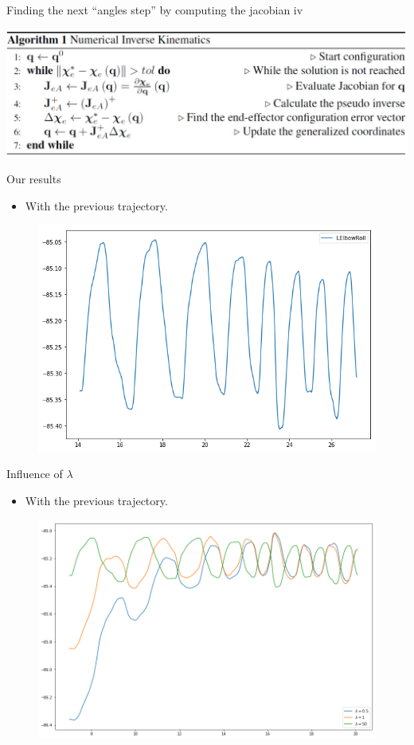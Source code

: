\documentclass{beamer}
\begin{document}
\begin{frame}{Finding the next ``angles step'' by computing the jacobian iv}

	\includegraphics[scale = 0.3]{eth3.PNG}\cite{6}
\end{frame}


\begin{frame}{Our results}
\begin{itemize}
\item With the previous trajectory.
\end{itemize}
\begin{figure}[h]
\centering
\includegraphics[width=0.8\linewidth]{elbowroll}
\end{figure}
\end{frame}

\begin{frame}{Influence of $\lambda$}
\begin{itemize}
	\item With the previous trajectory.
\end{itemize}
\begin{figure}[h]
	\centering
	\includegraphics[width=0.8\linewidth]{lambda}
\end{figure}
\end{frame}
\end{document}
